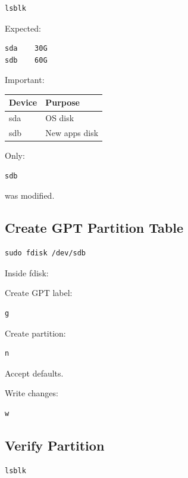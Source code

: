 \documentclass[11pt]{article}
\begin{document}
\begin{verbatim}
lsblk
\end{verbatim}

Expected:

\begin{verbatim}
sda    30G
sdb    60G
\end{verbatim}

Important:

\begin{center}
\begin{tabular}{ll}
Device & Purpose\\
\hline
sda & OS disk\\
sdb & New apps disk\\
\end{tabular}
\end{center}

Only:

\begin{verbatim}
sdb
\end{verbatim}

was modified.
\subsection{Create GPT Partition Table}
\label{sec:org6d8ece8}

\begin{verbatim}
sudo fdisk /dev/sdb
\end{verbatim}

Inside fdisk:

Create GPT label:

\begin{verbatim}
g
\end{verbatim}

Create partition:

\begin{verbatim}
n
\end{verbatim}

Accept defaults.

Write changes:

\begin{verbatim}
w
\end{verbatim}
\subsection{Verify Partition}
\label{sec:orgbedce2f}

\begin{verbatim}
lsblk
\end{verbatim}
\end{document}
